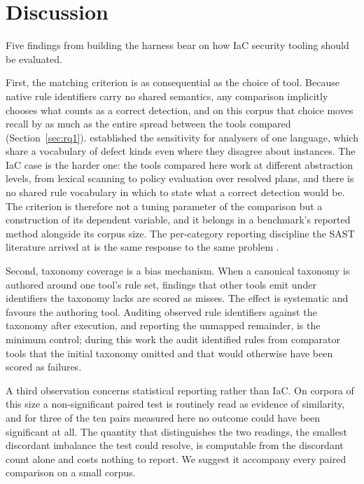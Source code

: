 \documentclass[smallextended]{svjour3}
\begin{document}
\section{Discussion}
\label{sec:discussion}

Five findings from building the harness bear on how IaC security tooling should
be evaluated.

First, the matching criterion is as consequential as the choice of tool. Because
native rule identifiers carry no shared semantics, any comparison implicitly
chooses what counts as a correct detection, and on this corpus that choice moves
recall by as much as the entire spread between the tools compared
(Section~\ref{sec:rq1}). \citet{habib2018howmany} established the sensitivity for
analysers of one language, which share a vocabulary of defect kinds even where
they disagree about instances. The IaC case is the harder one: the tools compared
here work at different abstraction levels, from lexical scanning to policy
evaluation over resolved plans, and there is no shared rule vocabulary in which
to state what a correct detection would be. The criterion is therefore not a
tuning parameter of the comparison but a construction of its dependent variable,
and it belongs in a benchmark's reported method alongside its corpus size. The
per-category reporting discipline the SAST literature arrived at is the same
response to the same problem \citep{li2023sast}.

Second, taxonomy coverage is a bias mechanism. When a canonical taxonomy is
authored around one tool's rule set, findings that other tools emit under
identifiers the taxonomy lacks are scored as misses. The effect is systematic and
favours the authoring tool. Auditing observed rule identifiers against the
taxonomy after execution, and reporting the unmapped remainder, is the minimum
control; during this work the audit identified rules from comparator tools that
the initial taxonomy omitted and that would otherwise have been scored as
failures.

A third observation concerns statistical reporting rather than IaC. On corpora of
this size a non-significant paired test is routinely read as evidence of
similarity, and for three of the ten pairs measured here no outcome could have
been significant at all. The quantity that distinguishes the two readings, the
smallest discordant imbalance the test could resolve, is computable from the
discordant count alone and costs nothing to report. We suggest it accompany every
paired comparison on a small corpus.
\end{document}

